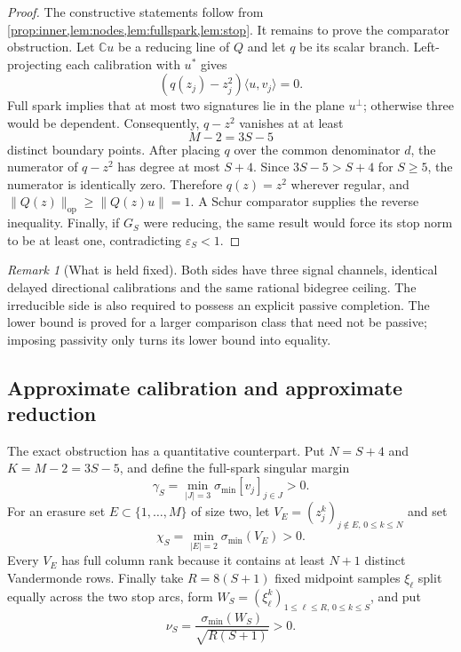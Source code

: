 \documentclass[11pt]{article}
\theoremstyle{definition}
\theoremstyle{remark}
\newtheorem{remark}[theorem]{Remark}
\newcommand{\C}{\mathbb{C}}
\newcommand{\op}{\mathrm{op}}
\begin{document}
\begin{proof}
The constructive statements follow from
\cref{prop:inner,lem:nodes,lem:fullspark,lem:stop}.  It remains to prove the
comparator obstruction.  Let $\C u$ be a reducing line of $Q$ and let $q$ be
its scalar branch.  Left-projecting each calibration with $u^*$ gives
\begin{equation}\label{eq:projected}
 (q(z_j)-z_j^2)\langle u,v_j\rangle=0.
\end{equation}
Full spark implies that at most two signatures lie in the plane $u^\perp$;
otherwise three would be dependent.  Consequently, $q-z^2$ vanishes at at
least
\[
 M-2=3S-5
\]
distinct boundary points.  After placing $q$ over the common denominator
$d$, the numerator of $q-z^2$ has degree at most $S+4$.  Since
$3S-5>S+4$ for $S\geq5$, the numerator is identically zero.  Therefore
$q(z)=z^2$ wherever regular, and
$\|Q(z)\|_{\op}\geq\|Q(z)u\|=1$.  A Schur comparator supplies the reverse
inequality.  Finally, if $G_S$ were reducing, the same result would force its
stop norm to be at least one, contradicting $\varepsilon_S<1$.
\end{proof}

\begin{remark}[What is held fixed]
Both sides have three signal channels, identical delayed directional
calibrations and the same rational bidegree ceiling.  The irreducible side is
also required to possess an explicit passive completion.  The lower bound is
proved for a larger comparison class that need not be passive; imposing
passivity only turns its lower bound into equality.
\end{remark}

\subsection{Approximate calibration and approximate reduction}

The exact obstruction has a quantitative counterpart.  Put $N=S+4$ and
$K=M-2=3S-5$, and define the full-spark singular margin
\begin{equation}\label{eq:gamma}
 \gamma_S=\min_{|J|=3}\sigma_{\min}[v_j]_{j\in J}>0.
\end{equation}
For an erasure set $E\subset\{1,\ldots,M\}$ of size two, let
$V_E=(z_j^k)_{j\notin E,\,0\leq k\leq N}$ and set
\begin{equation}\label{eq:chi}
 \chi_S=\min_{|E|=2}\sigma_{\min}(V_E)>0.
\end{equation}
Every $V_E$ has full column rank because it contains at least $N+1$ distinct
Vandermonde rows.  Finally take $R=8(S+1)$ fixed midpoint samples $\xi_\ell$
split equally across the two stop arcs, form
$W_S=(\xi_\ell^k)_{1\leq\ell\leq R,\,0\leq k\leq S}$, and put
\begin{equation}\label{eq:nu}
 \nu_S=\frac{\sigma_{\min}(W_S)}{\sqrt{R(S+1)}}>0.
\end{equation}
\end{document}
